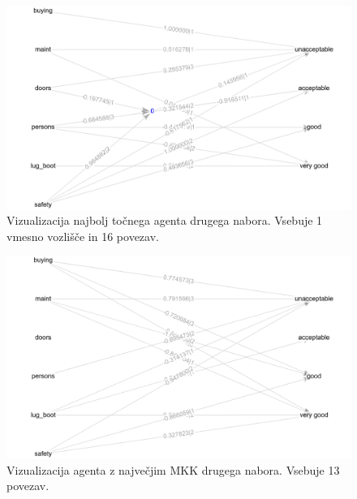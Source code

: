 \begin{figure}[H]
    \begin{center}
        \includegraphics[width=13cm]{car/2/acc_g}
    \end{center}
    \caption{Vizualizacija najbolj točnega agenta drugega nabora. Vsebuje 1 vmesno vozlišče in 16 povezav.}
    \label{fig:car_acc_2_g}
\end{figure}

\begin{figure}[H]
    \begin{center}
        \includegraphics[width=13cm]{car/2/mcc_g}
    \end{center}
    \caption{Vizualizacija agenta z največjim MKK drugega nabora. Vsebuje 13 povezav.}
    \label{fig:car_mcc_2_g}
\end{figure}

